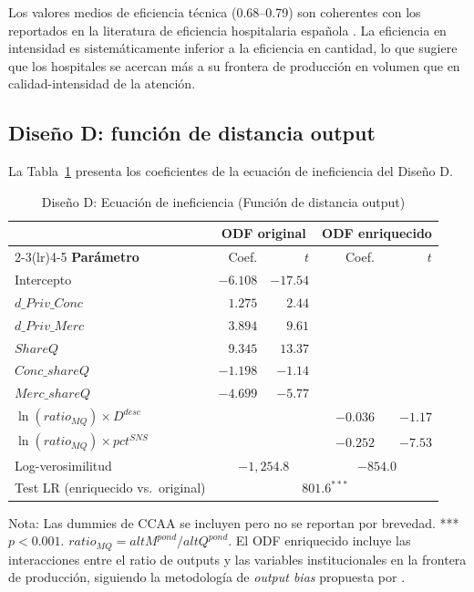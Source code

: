 \documentclass[12pt, a4paper]{article}
\begin{document}
Los valores medios de eficiencia técnica (0.68--0.79)
son coherentes con los reportados en la literatura
de eficiencia hospitalaria española \citep{puigjunoy2000}.
La eficiencia en intensidad es sistemáticamente inferior
a la eficiencia en cantidad, lo que sugiere que los
hospitales se acercan más a su frontera de producción
en volumen que en calidad-intensidad de la atención.

\subsection{Diseño D: función de distancia output}

La Tabla~\ref{tab:odf} presenta los coeficientes de la
ecuación de ineficiencia del Diseño D.

\begin{table}[h!]
\centering
\caption{Diseño D: Ecuación de ineficiencia
(Función de distancia output)}
\label{tab:odf}
\begin{threeparttable}
\begin{tabular}{lrrrr}
\toprule
& \multicolumn{2}{c}{\textbf{ODF original}}
& \multicolumn{2}{c}{\textbf{ODF enriquecido}} \\
\cmidrule(lr){2-3}\cmidrule(lr){4-5}
\textbf{Parámetro} & Coef. & $t$ & Coef. & $t$ \\
\midrule
Intercepto & $-6.108$ & $-17.54$ & & \\
$d\_Priv\_Conc$ & $1.275$ & $2.44$ & & \\
$d\_Priv\_Merc$ & $3.894$ & $9.61$ & & \\
$ShareQ$ & $9.345$ & $13.37$ & & \\
$Conc\_shareQ$ & $-1.198$ & $-1.14$ & & \\
$Merc\_shareQ$ & $-4.699$ & $-5.77$ & & \\
$\ln(ratio_{MQ}) \times D^{desc}$ & & &
  $-0.036$ & $-1.17$ \\
$\ln(ratio_{MQ}) \times pct^{SNS}$ & & &
  $-0.252$ & $-7.53$ \\
\midrule
Log-verosimilitud & \multicolumn{2}{c}{$-1{,}254.8$}
  & \multicolumn{2}{c}{$-854.0$} \\
Test LR (enriquecido vs.\ original) &
  \multicolumn{4}{c}{$801.6^{***}$} \\
\bottomrule
\end{tabular}
\begin{tablenotes}
  \small
  \item Nota: Las dummies de CCAA se incluyen pero no
    se reportan por brevedad. *** $p<0.001$.
    $ratio_{MQ} = altM^{pond}/altQ^{pond}$.
    El ODF enriquecido incluye las interacciones entre
    el ratio de outputs y las variables institucionales
    en la frontera de producción, siguiendo la
    metodología de \textit{output bias} propuesta por
    \citet{kumbhakar2015}.
\end{tablenotes}
\end{threeparttable}
\end{table}
\end{document}
